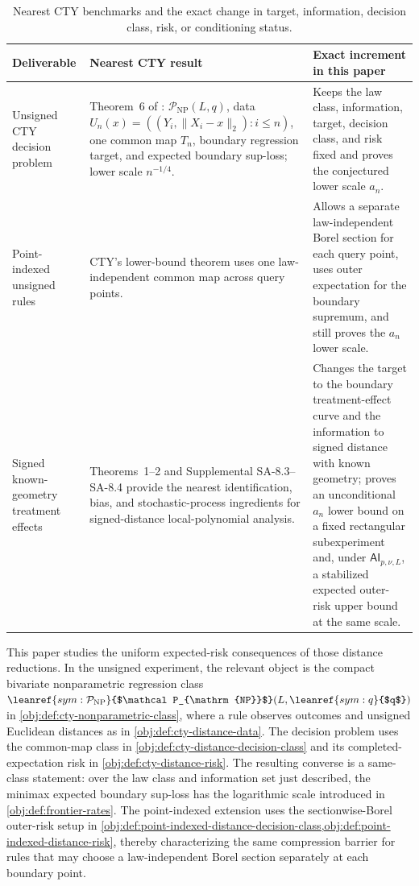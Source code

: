 \begin{table}[t]
\centering
\small
\renewcommand{\arraystretch}{1.15}
\begin{tabular}{p{}p{}p{}}
\hline
Deliverable & Nearest CTY result & Exact increment in this paper \\
\hline
Unsigned CTY decision problem & Theorem~6 of \citet{CattaneoTitiunikYu2026Distance}: \(\mathcal P_{\mathrm{NP}}(L,q)\), data \(U_n(x)=((Y_i,\lVert X_i-x\rVert_2):i\le n)\), one common map \(T_n\), boundary regression target, and expected boundary sup-loss; lower scale \(n^{-1/4}\). & Keeps the law class, information, target, decision class, and risk fixed and proves the conjectured lower scale \(a_n\). \\
Point-indexed unsigned rules & CTY's lower-bound theorem uses one law-independent common map across query points. & Allows a separate law-independent Borel section for each query point, uses outer expectation for the boundary supremum, and still proves the \(a_n\) lower scale. \\
Signed known-geometry treatment effects & Theorems~1--2 and Supplemental SA-8.3--SA-8.4 provide the nearest identification, bias, and stochastic-process ingredients for signed-distance local-polynomial analysis. & Changes the target to the boundary treatment-effect curve and the information to signed distance with known geometry; proves an unconditional \(a_n\) lower bound on a fixed rectangular subexperiment and, under \(\mathsf{AI}_{p,\nu,L}\), a stabilized expected outer-risk upper bound at the same scale. \\
\hline
\end{tabular}
\caption{Nearest CTY benchmarks and the exact change in target, information, decision class, risk, or conditioning status.}
\label{tab:cty-comparison}
\end{table}

This paper studies the uniform expected-risk consequences of those distance reductions. In the unsigned experiment, the relevant object is the compact bivariate nonparametric regression class \(\leanref{sym:\mathcal{P}_{\mathrm{NP}}}{$\mathcal P_{\mathrm{NP}}$}(L,\leanref{sym:q}{$q$})\) in \cref{obj:def:cty-nonparametric-class}, where a rule observes outcomes and unsigned Euclidean distances as in \cref{obj:def:cty-distance-data}. The decision problem uses the common-map class  in \cref{obj:def:cty-distance-decision-class} and its completed-expectation risk  in \cref{obj:def:cty-distance-risk}. The resulting converse is a same-class statement: over the law class and information set just described, the minimax expected boundary sup-loss has the logarithmic scale  introduced in \cref{obj:def:frontier-rates}. The point-indexed extension uses the sectionwise-Borel outer-risk setup in \cref{obj:def:point-indexed-distance-decision-class,obj:def:point-indexed-distance-risk}, thereby characterizing the same compression barrier for rules that may choose a law-independent Borel section separately at each boundary point.

